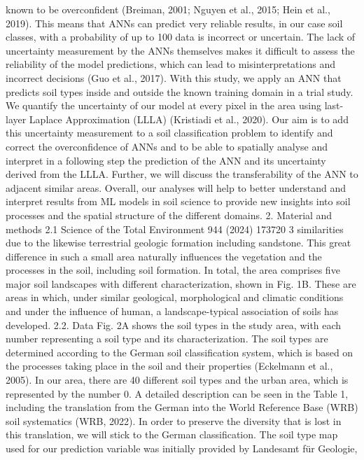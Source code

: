 known to be overconfident (Breiman, 2001; Nguyen et al., 2015; Hein
et al., 2019). This means that ANNs can predict very reliable results, in
our case soil classes, with a probability of up to 100 %
data is incorrect or uncertain. The lack of uncertainty measurement by
the ANNs themselves makes it difficult to assess the reliability of the
model predictions, which can lead to misinterpretations and incorrect
decisions (Guo et al., 2017). With this study, we apply an ANN that
predicts soil types inside and outside the known training domain in a
trial study. We quantify the uncertainty of our model at every pixel in
the area using last-layer Laplace Approximation (LLLA) (Kristiadi et al.,
2020). Our aim is to add this uncertainty measurement to a soil classification
problem to identify and correct the overconfidence of ANNs and
to be able to spatially analyse and interpret in a following step the
prediction of the ANN and its uncertainty derived from the LLLA.
Further, we will discuss the transferability of the ANN to adjacent
similar areas. Overall, our analyses will help to better understand and
interpret results from ML models in soil science to provide new insights
into soil processes and the spatial structure of the different domains.
2. Material and methods
2.1
Science of the Total Environment 944 (2024) 173720
3
similarities due to the likewise terrestrial geologic formation including
sandstone. This great difference in such a small area naturally influences
the vegetation and the processes in the soil, including soil formation. In
total, the area comprises five major soil landscapes with different
characterization, shown in Fig. 1B. These are areas in which, under
similar geological, morphological and climatic conditions and under the
influence of human, a landscape-typical association of soils has
developed.
2.2. Data
Fig. 2A shows the soil types in the study area, with each number
representing a soil type and its characterization. The soil types are
determined according to the German soil classification system, which is
based on the processes taking place in the soil and their properties
(Eckelmann et al., 2005). In our area, there are 40 different soil types
and the urban area, which is represented by the number 0. A detailed
description can be seen in the Table 1, including the translation from the
German into the World Reference Base (WRB) soil systematics (WRB,
2022).
In order to preserve the diversity that is lost in this translation, we
will stick to the German classification. The soil type map used for our
prediction variable was initially provided by Landesamt für Geologie,
